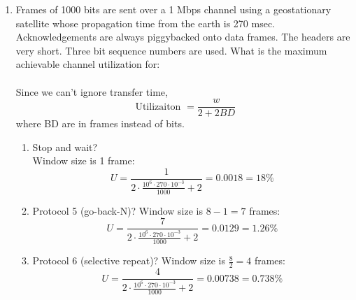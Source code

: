 \documentclass[12pt]{article}
\begin{document}
\begin{enumerate}
\item Frames of 1000 bits are sent over a 1 Mbps channel using a geostationary satellite whose propagation time from the earth is 270 msec. Acknowledgements are always piggybacked onto data frames. The headers are very short. Three bit sequence numbers are used. What is the maximum achievable channel utilization for: \\ \\
Since we can't ignore transfer time,
\[ \text{ Utilizaiton } = \frac{w}{2+2BD} \]
where BD are in frames instead of bits.
  \begin{enumerate}
  \item Stop and wait? \\
    Window size is 1 frame:
    \[ U = \frac{1}{2\cdot \frac{10^6\cdot 270 \cdot 10^{-3}}{1000} + 2} = 0.0018 = 18\%\] 
  \item Protocol 5 (go-back-N)?
    Window size is $8 - 1 = 7$ frames:
    \[ U = \frac{7}{2\cdot \frac{10^6 \cdot 270 \cdot 10^{-3}}{1000} +2} = 0.0129 = 1.26\% \]
  \item Protocol 6 (selective repeat)?
    Window size is $\frac{8}{2}=4$ frames:
    \[ U = \frac{4}{2\cdot \frac{10^6 \cdot 270 \cdot 10^{-3}}{1000} +2} = 0.00738 = 0.738\%\]
  \end{enumerate}
\end{enumerate}
\end{document}
